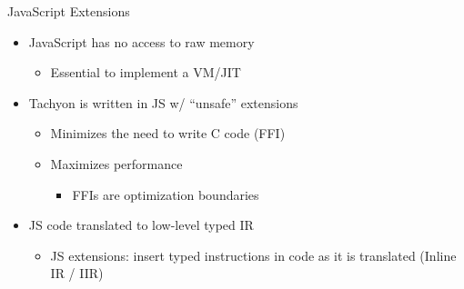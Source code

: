 \begin{frame}{JavaScript Extensions}
    \begin{itemize}
        \item JavaScript has no access to raw memory
        \begin{itemize}
            \item Essential to implement a VM/JIT
        \end{itemize}
        \item Tachyon is written in JS w/ “unsafe” extensions
        \begin{itemize}
            \item Minimizes the need to write C code (FFI)
            \item Maximizes performance
            \begin{itemize}
                \item FFIs are optimization boundaries
            \end{itemize}
        \end{itemize}
        \item JS code translated to low-level typed IR
        \begin{itemize}
            \item JS extensions: insert typed instructions in code as it is translated (Inline IR / IIR)
        \end{itemize}
    \end{itemize}
\end{frame}

